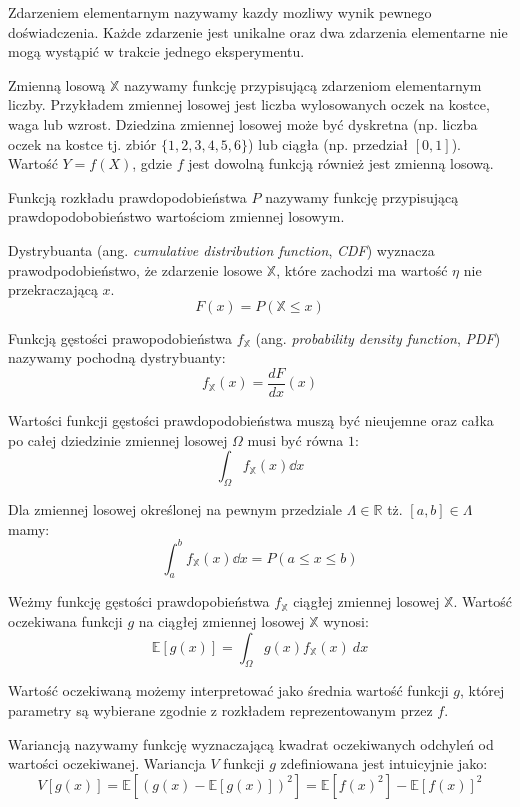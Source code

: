 \documentclass[../main.tex]{subfiles}
\begin{document}
Zdarzeniem elementarnym nazywamy kazdy mozliwy wynik pewnego doświadczenia. Każde zdarzenie jest unikalne oraz dwa zdarzenia elementarne nie mogą wystąpić w trakcie jednego eksperymentu.

Zmienną losową $\mathbb{X}$ nazywamy funkcję przypisującą zdarzeniom elementarnym liczby. Przykładem zmiennej losowej jest liczba wylosowanych oczek na kostce, waga lub wzrost. Dziedzina zmiennej losowej może być dyskretna (np. liczba oczek na kostce tj. zbiór $\{1,2,3,4,5,6\}$) lub ciągła (np. przedział $[0,1]$). Wartość $Y = f(X)$, gdzie $f$ jest dowolną funkcją również jest zmienną losową. 

Funkcją rozkładu prawdopodobieństwa $P$ nazywamy funkcję przypisującą prawdopodobobieństwo wartościom zmiennej losowym.

Dystrybuanta (ang. \textit{cumulative distribution function}, \textit{CDF})
wyznacza prawodpodobieństwo, że zdarzenie losowe $\mathbb{X}$, które zachodzi
ma wartość $\eta$ nie przekraczającą $x$.
\[
F(x) = P(\mathbb{X} \leq x)
\]

Funkcją gęstości prawopodobieństwa $f_{\mathbb{X}}$ (ang. \textit{probability density
function}, \textit{PDF}) nazywamy pochodną dystrybuanty:
\[
f_{\mathbb{X}}(x) = \frac{dF}{dx}(x)
\]

Wartości funkcji gęstości prawdopodobieństwa muszą być nieujemne oraz całka po całej dziedzinie zmiennej losowej $\Omega$ musi być równa $1$:
\[
\int_{\Omega} f_{\mathbb{X}}(x) \dd x
\]

Dla zmiennej losowej określonej na pewnym przedziale $\Lambda \in \mathbb{R}$ tż. $[a,b] \in \Lambda$ mamy:
\[
\int_{a}^{b} f_{\mathbb{X}}(x) \dd x = P(a \leq x \leq b)
\]

Weżmy funkcję gęstości prawdopobieństwa $f_{\mathbb{X}}$ ciągłej zmiennej
losowej $\mathbb{X}$. Wartość oczekiwana funkcji $g$ na ciągłej zmiennej
losowej $\mathbb{X}$ wynosi:
\[
\mathbb{E}\left[ g(x) \right] =
\int_{\Omega}{
	g(x) f_{\mathbb{X}}(x)
	\: dx
}
\]

Wartość oczekiwaną możemy interpretować jako średnia wartość funkcji $g$, której parametry są wybierane zgodnie z rozkładem reprezentowanym przez $f$.

Wariancją nazywamy funkcję wyznaczającą kwadrat oczekiwanych odchyleń od wartości oczekiwanej. Wariancja $V$ funkcji $g$ zdefiniowana jest intuicyjnie jako:
\[
V\left[ g(x) \right] 
	=
	\mathbb{E}\left[ 
		\left( 
			g(x) - \mathbb{E}\left[ g(x) \right] 
		\right)^2 
	\right]
	=
	\mathbb{E}\left[
		f(x)^2
	\right] - \mathbb{E}\left[
		f(x)
	\right]^2
\]
\end{document}
